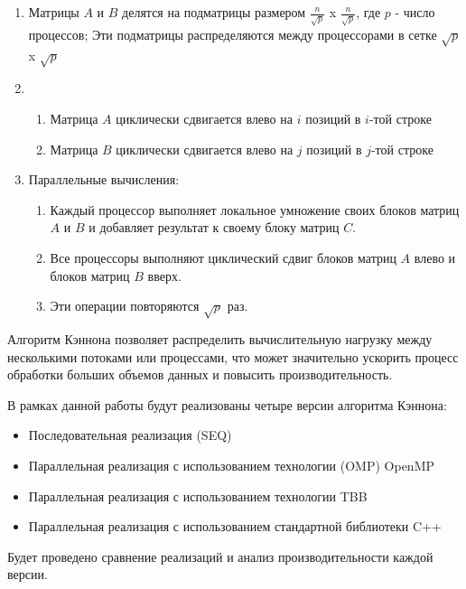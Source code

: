 \documentclass{report}
\begin{document}
\begin{enumerate}
\item Матрицы $A$ и $B$ делятся на подматрицы размером $\frac{n}{\sqrt{p}}$ x $\frac{n}{\sqrt{p}}$, где $p$ - число процессов;
Эти подматрицы распределяются между процессорами в сетке $\sqrt{p}$ x $\sqrt{p}$
\item 
\begin{enumerate}
\item Матрица $A$ циклически сдвигается влево на $i$ позиций в $i$-той строке
\item Матрица $B$ циклически сдвигается влево на $j$ позиций в $j$-той строке
\end{enumerate}
\item Параллельные вычисления:
\begin{enumerate}
\item Каждый процессор выполняет локальное умножение своих блоков матриц $A$ и $B$ и добавляет результат к своему блоку матриц $C$.
\item Все процессоры выполняют циклический сдвиг блоков матриц $A$  влево и блоков матриц $B$ вверх.
\item Эти операции повторяются $\sqrt{p}$ раз.
\end{enumerate}
\end{enumerate}

\par Алгоритм Кэннона позволяет распределить вычислительную нагрузку между несколькими потоками или процессами, что может значительно ускорить процесс обработки больших объемов данных и повысить производительность.

\par В рамках данной работы будут реализованы четыре версии алгоритма Кэннона:
\begin{itemize}
\item Последовательная реализация (SEQ)
\item Параллельная реализация с использованием технологии (OMP) OpenMP
\item Параллельная реализация с использованием технологии TBB
\item Параллельная реализация с использованием стандартной библиотеки C++
\end{itemize}
Будет проведено сравнение реализаций и анализ производительности каждой версии.

\newpage

\end{document}
